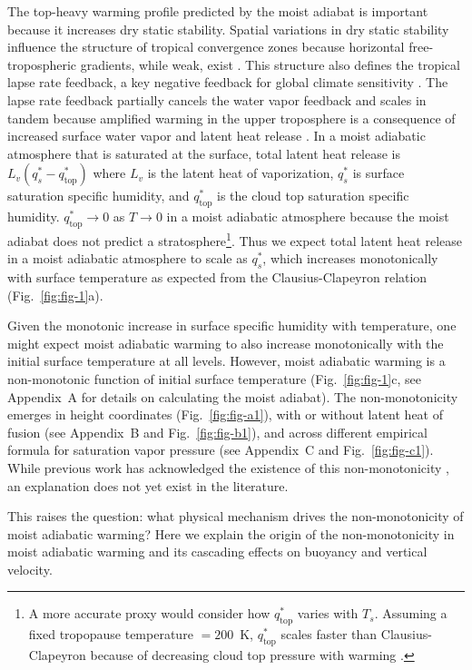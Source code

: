 \documentclass[]{ametsocV6.1}
\begin{document}
The top-heavy warming profile predicted by the moist adiabat is important because it increases dry static stability. Spatial variations in dry static stability influence the structure of tropical convergence zones because horizontal free-tropospheric gradients, while weak, exist \citep{neelin1987, bao2022}. This structure also defines the tropical lapse rate feedback, a key negative feedback for global climate sensitivity \citep{hansen1984}. The lapse rate feedback partially cancels the water vapor feedback and scales in tandem because amplified warming in the upper troposphere is a consequence of increased surface water vapor and latent heat release \citep{held2012}. In a moist adiabatic atmosphere that is saturated at the surface, total latent heat release is $L_v (q_s^*-q_\mathrm{top}^*)$ where $L_v$ is the latent heat of vaporization, $q_s^*$ is surface saturation specific humidity, and $q_\mathrm{top}^*$ is the cloud top saturation specific humidity. $q_\mathrm{top}^*\to0$ as $T\to0$ in a moist adiabatic atmosphere because the moist adiabat does not predict a stratosphere\footnote{A more accurate proxy would consider how $q_\mathrm{top}^*$ varies with $T_s$. Assuming a fixed tropopause temperature $=200$~K, $q_\mathrm{top}^*$ scales faster than Clausius-Clapeyron because of decreasing cloud top pressure with warming \citep{romps2016}.}. Thus we expect total latent heat release in a moist adiabatic atmosphere to scale as $q_s^*$, which increases monotonically with surface temperature as expected from the Clausius-Clapeyron relation (Fig.~\ref{fig:fig-1}a).

Given the monotonic increase in surface specific humidity with temperature, one might expect moist adiabatic warming to also increase monotonically with the initial surface temperature at all levels. However, moist adiabatic warming is a non-monotonic function of initial surface temperature (Fig.~\ref{fig:fig-1}c, see Appendix~A for details on calculating the moist adiabat). The non-monotonicity emerges in height coordinates (Fig.~\ref{fig:fig-a1}), with or without latent heat of fusion (see Appendix~B and Fig.~\ref{fig:fig-b1}), and across different empirical formula for saturation vapor pressure (see Appendix~C and Fig.~\ref{fig:fig-c1}). While previous work has acknowledged the existence of this non-monotonicity \citep{byrne2013, levine2016}, an explanation does not yet exist in the literature.

This raises the question: what physical mechanism drives the non-monotonicity of moist adiabatic warming? Here we explain the origin of the non-monotonicity in moist adiabatic warming and its cascading effects on buoyancy and vertical velocity.
\end{document}

